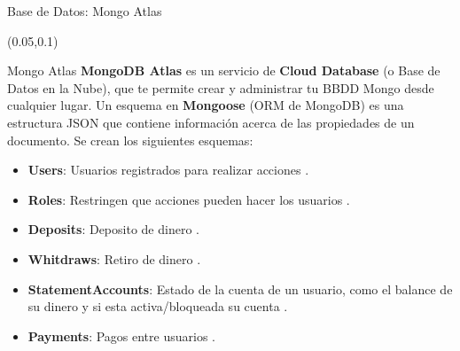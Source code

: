\documentclass[xcolor=pdftex,dvipsnames,table]{beamer}
\begin{document}
\begin{frame}{Base de Datos: Mongo Atlas}
    \begin{textblock*}{0.68\textwidth}(0.05\textwidth,0.1\textwidth)
            \begin{block}{Mongo Atlas} 
            \justifying
                \textbf{MongoDB Atlas} es un servicio de \textbf{Cloud Database} (o Base de Datos en la Nube), que te permite crear y administrar tu BBDD Mongo desde cualquier lugar. Un esquema en \textbf{Mongoose }(ORM de MongoDB) es una estructura JSON que contiene información acerca de las propiedades de un documento. Se crean los siguientes esquemas:  
                    \vspace{-0.0cm}
                    \footnotesize {
                    \begin{itemize}
                      \setlength\itemsep{0.1em}
                        \item {\textbf{Users}: Usuarios registrados para realizar acciones .}
                        \item {\textbf{Roles}: Restringen que acciones pueden hacer los usuarios .}
                        \item {\textbf{Deposits}: Deposito de dinero .}
                        \item {\textbf{Whitdraws}: Retiro de dinero .}
                        \item {\textbf{StatementAccounts}: Estado de la cuenta de un usuario, como el balance de su dinero y si esta activa/bloqueada su cuenta .}
                        \item {\textbf{Payments}: Pagos entre usuarios .}
                    \end{itemize}}
            \end{block}
    \end{textblock*}
    

\end{frame}
\end{document}
